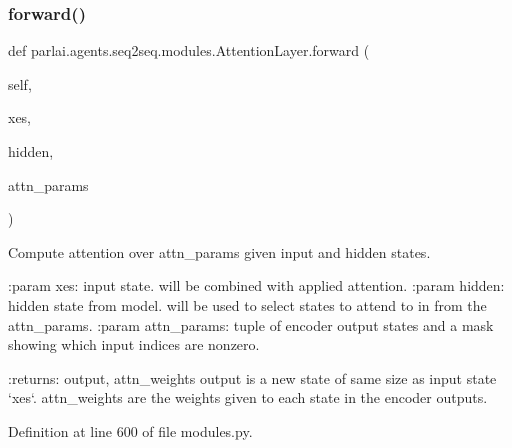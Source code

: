 \subsubsection{\texorpdfstring{forward()}{forward()}}
{\footnotesize\ttfamily def parlai.\+agents.\+seq2seq.\+modules.\+Attention\+Layer.\+forward (\begin{DoxyParamCaption}\item[{}]{self,  }\item[{}]{xes,  }\item[{}]{hidden,  }\item[{}]{attn\+\_\+params }\end{DoxyParamCaption})}

\begin{DoxyVerb}Compute attention over attn_params given input and hidden states.

:param xes:         input state. will be combined with applied
            attention.
:param hidden:      hidden state from model. will be used to select
            states to attend to in from the attn_params.
:param attn_params: tuple of encoder output states and a mask showing
            which input indices are nonzero.

:returns: output, attn_weights
  output is a new state of same size as input state `xes`.
  attn_weights are the weights given to each state in the
  encoder outputs.
\end{DoxyVerb}
 

Definition at line 600 of file modules.\+py.



